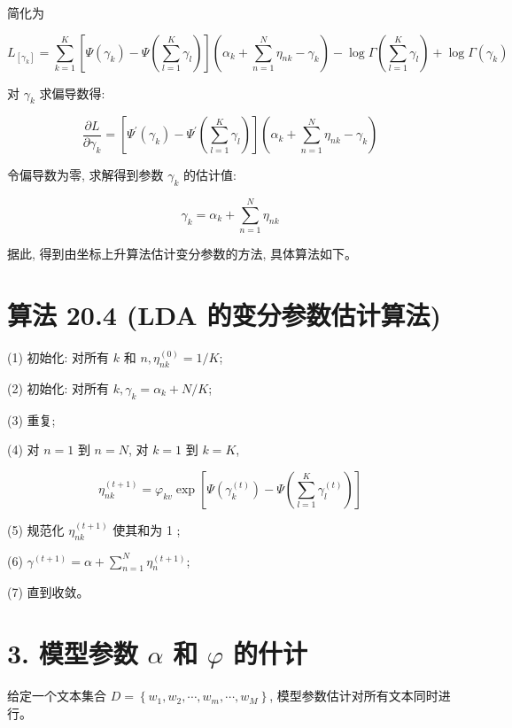 \documentclass[10pt]{article}
\begin{document}
\begin{CJK*}{UTF8}{bsmi}
简化为


\begin{equation*}
L_{\left[\gamma_{k}\right]}=\sum_{k=1}^{K}\left[\Psi\left(\gamma_{k}\right)-\Psi\left(\sum_{l=1}^{K} \gamma_{l}\right)\right]\left(\alpha_{k}+\sum_{n=1}^{N} \eta_{n k}-\gamma_{k}\right)-\log \Gamma\left(\sum_{l=1}^{K} \gamma_{l}\right)+\log \Gamma\left(\gamma_{k}\right) \tag{20.60}
\end{equation*}


对 $\gamma_{k}$ 求偏导数得:


\begin{equation*}
\frac{\partial L}{\partial \gamma_{k}}=\left[\Psi^{\prime}\left(\gamma_{k}\right)-\Psi^{\prime}\left(\sum_{l=1}^{K} \gamma_{l}\right)\right]\left(\alpha_{k}+\sum_{n=1}^{N} \eta_{n k}-\gamma_{k}\right) \tag{20.61}
\end{equation*}


令偏导数为零, 求解得到参数 $\gamma_{k}$ 的估计值:


\begin{equation*}
\gamma_{k}=\alpha_{k}+\sum_{n=1}^{N} \eta_{n k} \tag{20.62}
\end{equation*}


据此, 得到由坐标上升算法估计变分参数的方法, 具体算法如下。

\section*{算法 20.4 (LDA 的变分参数估计算法)}
(1) 初始化: 对所有 $k$ 和 $n, \eta_{n k}^{(0)}=1 / K$;

(2) 初始化: 对所有 $k, \gamma_{k}=\alpha_{k}+N / K$;

(3) 重复;

(4) 对 $n=1$ 到 $n=N$, 对 $k=1$ 到 $k=K$,

$$
\eta_{n k}^{(t+1)}=\varphi_{k v} \exp \left[\Psi\left(\gamma_{k}^{(t)}\right)-\Psi\left(\sum_{l=1}^{K} \gamma_{l}^{(t)}\right)\right]
$$

(5) 规范化 $\eta_{n k}^{(t+1)}$ 使其和为 1 ;

(6) $\gamma^{(t+1)}=\alpha+\sum_{n=1}^{N} \eta_{n}^{(t+1)}$;

(7) 直到收敛。

\section*{3. 模型参数 $\alpha$ 和 $\varphi$ 的什计}
给定一个文本集合 $D=\left\{w_{1}, w_{2}, \cdots, w_{m}, \cdots, w_{M}\right\}$, 模型参数估计对所有文本同时进行。


\end{CJK*}
\end{document}
